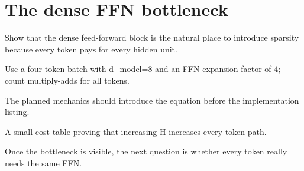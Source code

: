 \section{The dense FFN bottleneck}
\label{sec:ch01-the-dense-ffn-bottleneck}

Show that the dense feed-forward block is the natural place to introduce sparsity because every token pays for every hidden unit.



Use a four-token batch with d\_model=8 and an FFN expansion factor of 4; count multiply-adds for all tokens.



The planned mechanics should introduce the equation before the implementation listing.





\begin{checkpointbox}
A small cost table proving that increasing H increases every token path.
\end{checkpointbox}

Once the bottleneck is visible, the next question is whether every token really needs the same FFN.
